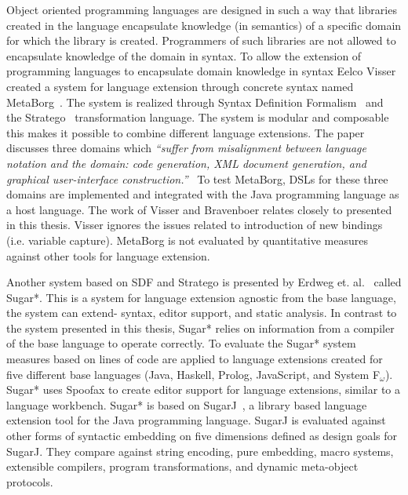 Object oriented programming languages are designed in such a way that libraries created in the language encapsulate knowledge (in semantics) of a specific domain for which the library is created. Programmers of such libraries are not allowed to encapsulate knowledge of the domain in syntax. To allow the extension of programming languages to encapsulate domain knowledge in syntax Eelco Visser created a system for language extension through concrete syntax named MetaBorg~\cite{Bravenboer2004}. The system is realized through Syntax Definition Formalism~\cite{Heering1989} and the Stratego~\cite{Visser2001a} transformation language. The system is modular and composable this makes it possible to combine different language extensions. The paper discusses three domains which \textit{``suffer from misalignment between language notation and the domain: code generation, XML document generation, and graphical user-interface construction.''}~\cite{Visser20024} To test MetaBorg, DSLs for these three domains are implemented and integrated with the Java programming language as a host language. The work of Visser and Bravenboer relates closely to \projectname{} presented in this thesis. Visser ignores the issues related to introduction of new bindings (i.e. variable capture). MetaBorg is not evaluated by quantitative measures against other tools for language extension.

Another system based on SDF and Stratego is presented by Erdweg et. al.~\cite{Erdweg} called Sugar*. This is a system for language extension agnostic from the base language, the system can extend- syntax, editor support, and static analysis. In contrast to the system presented in this thesis, Sugar* relies on information from a compiler of the base language to operate correctly. To evaluate the Sugar* system measures based on lines of code are applied to language extensions created for five different base languages (Java, Haskell, Prolog, JavaScript, and System F$_{\omega}$). Sugar* uses Spoofax to create editor support for language extensions, similar to a language workbench. Sugar* is based on SugarJ~\cite{Erdweg2011}, a library based language extension tool for the Java programming language. SugarJ is evaluated against other forms of syntactic embedding on five dimensions defined as design goals for SugarJ. They compare against string encoding, pure embedding, macro systems, extensible compilers, program transformations, and dynamic meta-object protocols.

